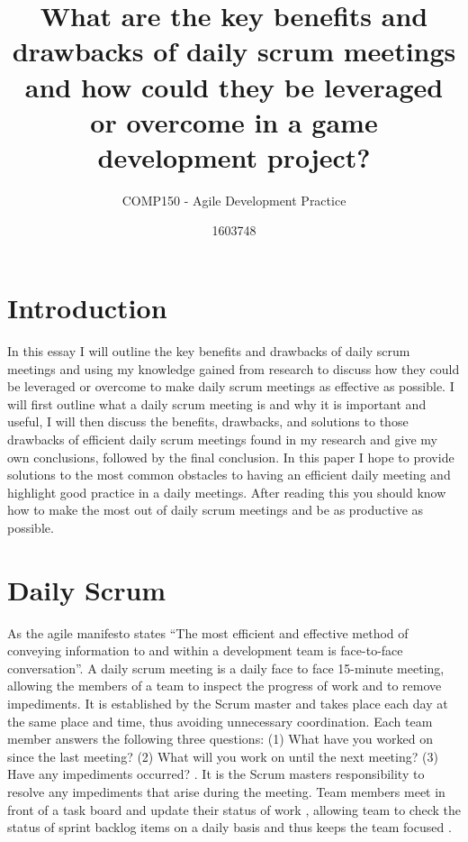\documentclass{scrartcl}
\title{What are the key benefits and drawbacks of daily scrum meetings and how could they be leveraged or overcome in a game development project?}
\subtitle{COMP150 - Agile Development Practice}
\author{1603748}
\begin{document}
\maketitle


\section{Introduction}

In this essay I will outline the key benefits and drawbacks of daily scrum meetings and using my knowledge gained from research to discuss how they could be leveraged or overcome to make daily scrum meetings as effective as possible. I will first outline what a daily scrum meeting is and why it is important and useful, I will then discuss the benefits, drawbacks, and solutions to those drawbacks of efficient daily scrum meetings found in my research and give my own conclusions, followed by the final conclusion. In this paper I hope to provide solutions to the most common obstacles to having an efficient daily meeting and highlight good practice in a daily meetings. After reading this you should know how to make the most out of daily scrum meetings and be as productive as possible.

\section{Daily Scrum}

As the agile manifesto \cite{Manifesto} states ``The most efficient and effective method of 
conveying information to and within a development 
team is face-to-face conversation''. A daily scrum meeting is a daily face to face 15-minute meeting, allowing the members of a team to inspect the progress of work and to remove impediments. It is established by the Scrum master and takes place each day at the same place and time, thus avoiding unnecessary coordination. Each team member answers the following three questions: (1) What have you worked on since the last meeting? (2) What will you work on until the next meeting? (3) Have any impediments occurred? \cite{ScrumEveryDay}. It is the Scrum masters responsibility to resolve any impediments that arise during the meeting. Team members meet in front of a task board and update their status of work \cite{Multitouch}, allowing team to check the status of sprint backlog items on a daily basis and thus keeps the team focused \cite{ScrumEveryDay}.
\end{document}
